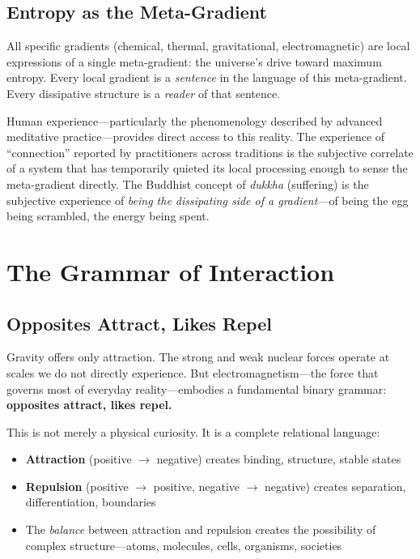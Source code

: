 \documentclass[11pt,a4paper]{article}
\begin{document}
\subsection{Entropy as the Meta-Gradient}

All specific gradients (chemical, thermal, gravitational, electromagnetic) are local expressions of a single meta-gradient: the universe's drive toward maximum entropy. Every local gradient is a \emph{sentence} in the language of this meta-gradient. Every dissipative structure is a \emph{reader} of that sentence.

Human experience---particularly the phenomenology described by advanced meditative practice---provides direct access to this reality. The experience of ``connection'' reported by practitioners across traditions is the subjective correlate of a system that has temporarily quieted its local processing enough to sense the meta-gradient directly. The Buddhist concept of \emph{dukkha} (suffering) is the subjective experience of \emph{being the dissipating side of a gradient}---of being the egg being scrambled, the energy being spent.

\section{The Grammar of Interaction}

\subsection{Opposites Attract, Likes Repel}

Gravity offers only attraction. The strong and weak nuclear forces operate at scales we do not directly experience. But electromagnetism---the force that governs most of everyday reality---embodies a fundamental binary grammar: \textbf{opposites attract, likes repel.}

This is not merely a physical curiosity. It is a complete relational language:

\begin{itemize}
    \item \textbf{Attraction} (positive $\rightarrow$ negative) creates binding, structure, stable states
    \item \textbf{Repulsion} (positive $\rightarrow$ positive, negative $\rightarrow$ negative) creates separation, differentiation, boundaries
    \item The \emph{balance} between attraction and repulsion creates the possibility of complex structure---atoms, molecules, cells, organisms, societies
\end{itemize}
\end{document}
